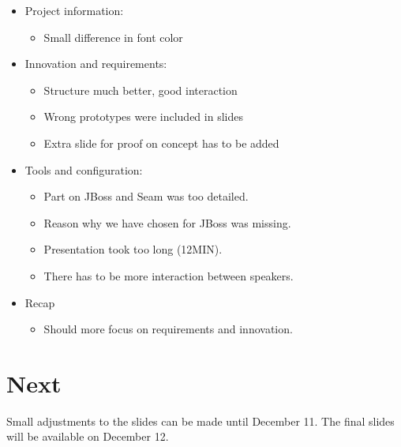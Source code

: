 \documentclass[a4paper, 12pt]{article}
\begin{document}
\begin{itemize}
	
	\item Project information:
	\begin{itemize}
		\item Small difference in font color 
	\end{itemize}
	
	\item Innovation and requirements:
	\begin{itemize}
		\item Structure much better, good interaction
		\item Wrong prototypes were included in slides
		\item Extra slide for proof on concept has to be added 
	\end{itemize}
	
	\item Tools and configuration:
	\begin{itemize}
		\item Part on JBoss and Seam was too detailed. 
		\item Reason why we have chosen for JBoss was missing.
		\item Presentation took too long (12MIN). 
		\item There has to be more interaction between speakers.
	\end{itemize}
	
	\item Recap
	\begin{itemize}
		\item Should more focus on requirements and innovation. 
	\end{itemize}
	
\end{itemize}


\section{Next}

Small adjustments to the slides can be made until December 11. The final slides will be available on December 12.
\end{document}
